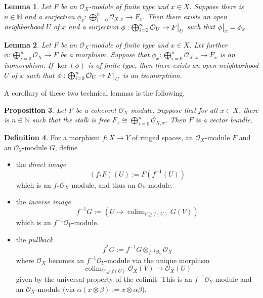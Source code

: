 \documentclass{scrartcl}
\newcommand{\N}{\mathbb{N}}
\renewcommand{\O}{\mathcal{O}}
\DeclareMathOperator*{\colim}{colim}
\newcommand\restr[2]{{
    \left.\kern-\nulldelimiterspace
    #1
    \vphantom{\big|}
    \right|_{#2}
}}
\newtheorem{prop}{Proposition}[section]
\newtheorem{lemma}[prop]{Lemma}
\theoremstyle{definition}
\newtheorem{definition}[prop]{Definition}
\begin{document}
\begin{lemma}
    Let $F$ be an $\O_X$-module of finite type and $x \in X$.
    Suppose there is $n \in \N$ and a surjection $\phi_x: \bigoplus_{i = 0}^n \O_{X, x} \to F_x$.
    Then there exists an open neighborhood $U$ of $x$ and a surjection $\phi: \bigoplus_{i = 0}^n \O_U \to \restr{F}{U}$ such that $\restr{\phi}{x} = \phi_x$.
\end{lemma}
\begin{lemma}
    Let $F$ be an $\O_X$-module of finite type and $x \in X$.
    Let further $\phi: \bigoplus_{i = 0}^n \O_X \to F$ be a morphism.
    Suppose that $\phi_x: \bigoplus_{i = 0}^n \O_{X, x} \to F_x$ is an isomorphism.
    If $\ker(\phi)$ is of finite type, then there exists an open neighborhood $U$ of $x$ such that $\phi: \bigoplus_{i = 0}^n \O_U \to \restr{F}{U}$ is an isomorphism.
\end{lemma}
A corollary of these two technical lemmas is the following.
\begin{prop}
    Let $F$ be a coherent $\O_X$-module.
    Suppose that for all $x \in X$, there is $n \in \N$ such that the stalk is free $F_x \cong \bigoplus_{i = 0}^n \O_{X, x}$.
    Then $F$ is a vector bundle.
\end{prop}
\begin{definition}
    For a morphism $f: X \to Y$ of ringed spaces, an $\O_X$-module $F$ and an $\O_Y$-module $G$, define
    \begin{itemize}
        \item the \emph{direct image}
        \begin{equation*}
            (f_*F)(U) := F(f^{-1}(U))
        \end{equation*}
        which is an $f_*\O_X$-module, and thus an $\O_Y$-module.
        \item the \emph{inverse image}
        \begin{equation*}
            f^{-1}G := \left( U \mapsto \colim_{V \supseteq f(U)} G(V) \right)
        \end{equation*}
        which is an $f^{-1}\O_Y$-module.
        \item the \emph{pullback}
        \begin{equation*}
            f^*G := f^{-1}G \otimes_{f^{-1}\O_Y} \O_X
        \end{equation*}
        where $\O_X$ becomes an $f^{-1}\O_Y$-module via the unique morphism
        \begin{equation*}
            \colim_{V \supseteq f(U)} \O_X(V) \to \O_X(U)
        \end{equation*}
        given by the universal property of the colimit.
        This is an $f^{-1}\O_Y$-module and an $\O_X$-module (via $\alpha(x \otimes \beta) := x \otimes \alpha \beta$).
    \end{itemize}
\end{definition}
\end{document}

